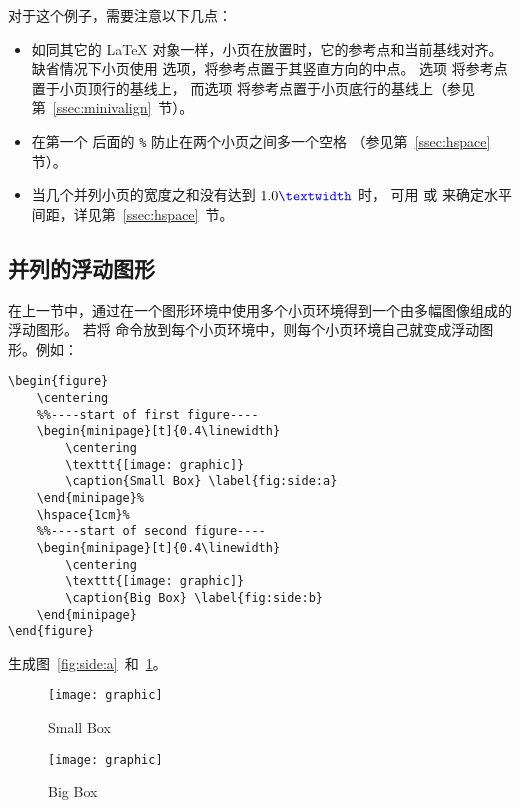 对于这个例子，需要注意以下几点：
\begin{itemize}
	\item 如同其它的 \LaTeX{} 对象一样，小页在放置时，它的参考点和当前基线对齐。
	缺省情况下小页使用 \opt{[c]} 选项，将参考点置于其竖直方向的中点。
	选项 \opt{[t]} 将参考点置于小页顶行的基线上，
	而选项 \opt{[b]} 将参考点置于小页底行的基线上（参见第~\ref{ssec:minivalign}~节）。
	
	\item 在第一个  后面的 \texttt{\%} 防止在两个小页之间多一个空格
	（参见第~\ref{ssec:hspace} 节）。
	
	\item 当几个并列小页的宽度之和没有达到 $1.0\text{\cmd{textwidth}}$ 时，
	可用  或  来确定水平间距，详见第~\ref{ssec:hspace}~节。
\end{itemize}


\subsection{并列的浮动图形}\label{ssec:sidefigure}

在上一节中，通过在一个图形环境中使用多个小页环境得到一个由多幅图像组成的浮动图形。
若将   命令放到每个小页环境中，则每个小页环境自己就变成浮动图形。例如：
\begin{lstlisting}
\begin{figure}
	\centering
	%%----start of first figure----
	\begin{minipage}[t]{0.4\linewidth}
		\centering
		\texttt{[image: graphic]}
		\caption{Small Box} \label{fig:side:a}
	\end{minipage}%
	\hspace{1cm}%
	%%----start of second figure----
	\begin{minipage}[t]{0.4\linewidth}
		\centering
		\texttt{[image: graphic]}
		\caption{Big Box} \label{fig:side:b}
	\end{minipage}
\end{figure}
\end{lstlisting}
生成图~\ref{fig:side:a}~和~\ref{fig:side:b}。

\begin{figure}
	\centering
	\begin{minipage}[t]{0.4\linewidth}
		\centering
		\texttt{[image: graphic]}
		\caption{Small Box} \label{fig:side:a}
	\end{minipage}%
	\hspace{1cm}%
	\begin{minipage}[t]{0.4\linewidth}
		\centering
		\texttt{[image: graphic]}
		\caption{Big Box} \label{fig:side:b}
	\end{minipage}
\end{figure}

